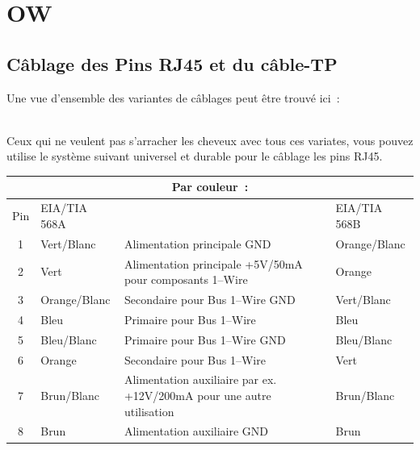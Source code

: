 \section{OW}
{
\subsection{Câblage des Pins RJ45 et du câble-TP}
}

Une vue d'ensemble des variantes de câblages peut être trouvé ici~:

\\

Ceux qui ne veulent pas s'arracher les cheveux avec tous ces variates, vous pouvez utilise
le système suivant universel et durable pour le câblage les pins RJ45. \\

\begin{center}
\begin{tabular}{|c|l|l|l|}
\hline
   \multicolumn{4}{|c|}{Par couleur~:} \\ \hline
Pin & EIA/TIA 568A &                                                     & EIA/TIA 568B \\ \hline
1   & Vert/Blanc   & Alimentation principale GND                         & Orange/Blanc  \\ \hline
2   & Vert         & Alimentation principale +5V/50mA pour composants 1--Wire & Orange \\ \hline
3   & Orange/Blanc & Secondaire pour Bus 1--Wire GND                     & Vert/Blanc \\ \hline
4   & Bleu         & Primaire pour Bus 1--Wire                           & Bleu \\ \hline
5   & Bleu/Blanc   & Primaire pour Bus 1--Wire  GND                      & Bleu/Blanc \\ \hline
6   & Orange       & Secondaire pour Bus 1--Wire                         & Vert \\ \hline
7   & Brun/Blanc   & Alimentation auxiliaire par ex. +12V/200mA pour une autre utilisation
                                                                         & Brun/Blanc \\ \hline
8   & Brun         & Alimentation auxiliaire GND                         & Brun \\ \hline
\end{tabular}
\end{center}

